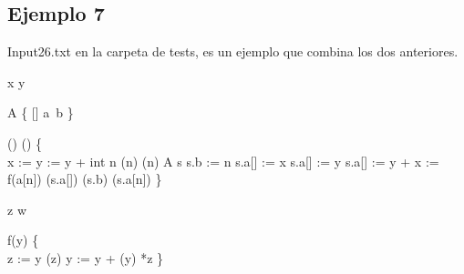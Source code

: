 \newpage


\subsection{Ejemplo 7}
Input26.txt en la carpeta de tests, es un ejemplo que combina los dos anteriores.

\begin{algorithm}

	\Integer{} x  \;
	\Integer{} y  \;
	
	 A \{
		\quad {}[] a\,
		\quad {} b\;
	\} \;
	
	\Void() () \{ \\
	\quad x :=  \;
	\quad y := y + \;
	\quad int n\;
	\quad {}(n)\;
	\quad {}(n)\;
	\quad {} A s\;
	\quad s.b := n\;
	\quad s.a[] := x\;
	\quad s.a[] := y\;
	\quad s.a[] := y + \;
	\quad x := f(a[n])\;
	\quad {}(s.a[])\;
	\quad {}(s.b)\;
	\quad {}(s.a[n])\;
	\}\;

 	\Integer{} z \;
	\Integer{} w \;
	
	 f(y) \{ \\
	\quad z := y \;
	\quad {}(z) \;
	\quad y := y +  \;
	\quad {}(y) \;
	\quad {} *z \;
	\}\;
	
\end{algorithm}










